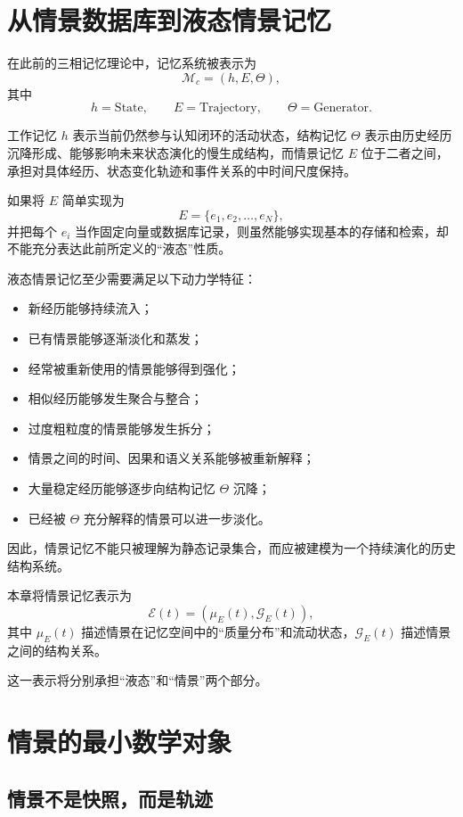 \section{从情景数据库到液态情景记忆}

在此前的三相记忆理论中，记忆系统被表示为
\[
\mathcal{M}_c=(h,E,\Theta),
\]
其中
\[
h=\mathrm{State},
\qquad
E=\mathrm{Trajectory},
\qquad
\Theta=\mathrm{Generator}.
\]

工作记忆 $h$ 表示当前仍然参与认知闭环的活动状态，结构记忆 $\Theta$ 表示由历史经历沉降形成、能够影响未来状态演化的慢生成结构，而情景记忆 $E$ 位于二者之间，承担对具体经历、状态变化轨迹和事件关系的中时间尺度保持。

如果将 $E$ 简单实现为
\[
E=\{e_1,e_2,\ldots,e_N\},
\]
并把每个 $e_i$ 当作固定向量或数据库记录，则虽然能够实现基本的存储和检索，却不能充分表达此前所定义的“液态”性质。

液态情景记忆至少需要满足以下动力学特征：

\begin{itemize}
    \item 新经历能够持续流入；
    \item 已有情景能够逐渐淡化和蒸发；
    \item 经常被重新使用的情景能够得到强化；
    \item 相似经历能够发生聚合与整合；
    \item 过度粗粒度的情景能够发生拆分；
    \item 情景之间的时间、因果和语义关系能够被重新解释；
    \item 大量稳定经历能够逐步向结构记忆 $\Theta$ 沉降；
    \item 已经被 $\Theta$ 充分解释的情景可以进一步淡化。
\end{itemize}

因此，情景记忆不能只被理解为静态记录集合，而应被建模为一个持续演化的历史结构系统。

本章将情景记忆表示为
\[
\boxed{
\mathcal{E}(t)
=
\left(
\mu_E(t),
\mathcal{G}_E(t)
\right),
}
\]
其中 $\mu_E(t)$ 描述情景在记忆空间中的“质量分布”和流动状态，$\mathcal{G}_E(t)$ 描述情景之间的结构关系。

这一表示将分别承担“液态”和“情景”两个部分。

\section{情景的最小数学对象}

\subsection{情景不是快照，而是轨迹}

